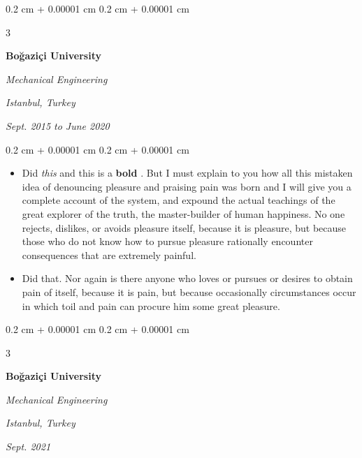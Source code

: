 \documentclass[10pt, letterpaper]{article}
\newenvironment{highlights}{
    \begin{itemize}[
        topsep=0.10 cm,
        parsep=0.10 cm,
        partopsep=0pt,
        itemsep=0pt,
        leftmargin=0.4 cm + 10pt + 0.6 cm
    ]
}{
    \end{itemize}
} %
\newenvironment{onecolentry}{
    \begin{adjustwidth}{
        0.2 cm + 0.00001 cm
    }{
        0.2 cm + 0.00001 cm
    }
}{
    \end{adjustwidth}
} %
\newenvironment{threecolentry}[3][]{
    \onecolentry
    \def\thirdColumn{#3}
    \setcolumnwidth{0.6 cm, \fill, 4.5 cm}
    \begin{paracol}{3}
    #2 \switchcolumn
}{
    \switchcolumn \raggedleft \thirdColumn
    \end{paracol}
    \endonecolentry
} %
\let\hrefWithoutArrow\href
\renewcommand{\href}[2]{\hrefWithoutArrow{#1}{\mbox{\ifthenelse{\equal{#2}{}}{ }{#2 }\raisebox{.15ex}{\footnotesize \faExternalLink*}}}}
\begin{document}
        \vspace{0.2 cm-3px}

        \begin{threecolentry}{
            \vspace*{\fill}
            \textbullet
            \vspace*{3px}
            \vspace*{\fill}
        }{
        \textit{Istanbul, Turkey}    
            
        \textit{Sept. 2015 to June 2020}}
            \textbf{Boğaziçi University}

            \textit{Mechanical Engineering}
        \end{threecolentry}

        \vspace{0.10 cm-3px}
        \begin{onecolentry}
            \begin{highlights}
                \item Did \textit{this} and this is a \textbf{bold} \href{https://example.com}{link}. But I must explain to you how all this mistaken idea of denouncing pleasure and praising pain was born and I will give you a complete account of the system, and expound the actual teachings of the great explorer of the truth, the master-builder of human happiness. No one rejects, dislikes, or avoids pleasure itself, because it is pleasure, but because those who do not know how to pursue pleasure rationally encounter consequences that are extremely painful.
                \item Did that. Nor again is there anyone who loves or pursues or desires to obtain pain of itself, because it is pain, but because occasionally circumstances occur in which toil and pain can procure him some great pleasure.
            \end{highlights}
        \end{onecolentry}


        \vspace{0.2 cm-3px}

        \begin{threecolentry}{
            \vspace*{\fill}
            \textbullet
            \vspace*{3px}
            \vspace*{\fill}
        }{
        \textit{Istanbul, Turkey}    
            
        \textit{Sept. 2021}}
            \textbf{Boğaziçi University}

            \textit{Mechanical Engineering}
        \end{threecolentry}
\end{document}
